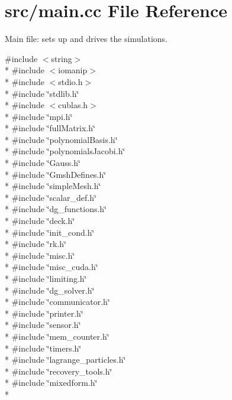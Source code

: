\section{src/main.cc File Reference}
\label{main_8cc}


Main file\-: sets up and drives the simulations.  


{\ttfamily \#include $<$string$>$}\\*
{\ttfamily \#include $<$iomanip$>$}\\*
{\ttfamily \#include $<$stdio.\-h$>$}\\*
{\ttfamily \#include \char`\"{}stdlib.\-h\char`\"{}}\\*
{\ttfamily \#include $<$cublas.\-h$>$}\\*
{\ttfamily \#include \char`\"{}mpi.\-h\char`\"{}}\\*
{\ttfamily \#include \char`\"{}full\-Matrix.\-h\char`\"{}}\\*
{\ttfamily \#include \char`\"{}polynomial\-Basis.\-h\char`\"{}}\\*
{\ttfamily \#include \char`\"{}polynomials\-Jacobi.\-h\char`\"{}}\\*
{\ttfamily \#include \char`\"{}Gauss.\-h\char`\"{}}\\*
{\ttfamily \#include \char`\"{}Gmsh\-Defines.\-h\char`\"{}}\\*
{\ttfamily \#include \char`\"{}simple\-Mesh.\-h\char`\"{}}\\*
{\ttfamily \#include \char`\"{}scalar\-\_\-def.\-h\char`\"{}}\\*
{\ttfamily \#include \char`\"{}dg\-\_\-functions.\-h\char`\"{}}\\*
{\ttfamily \#include \char`\"{}deck.\-h\char`\"{}}\\*
{\ttfamily \#include \char`\"{}init\-\_\-cond.\-h\char`\"{}}\\*
{\ttfamily \#include \char`\"{}rk.\-h\char`\"{}}\\*
{\ttfamily \#include \char`\"{}misc.\-h\char`\"{}}\\*
{\ttfamily \#include \char`\"{}misc\-\_\-cuda.\-h\char`\"{}}\\*
{\ttfamily \#include \char`\"{}limiting.\-h\char`\"{}}\\*
{\ttfamily \#include \char`\"{}dg\-\_\-solver.\-h\char`\"{}}\\*
{\ttfamily \#include \char`\"{}communicator.\-h\char`\"{}}\\*
{\ttfamily \#include \char`\"{}printer.\-h\char`\"{}}\\*
{\ttfamily \#include \char`\"{}sensor.\-h\char`\"{}}\\*
{\ttfamily \#include \char`\"{}mem\-\_\-counter.\-h\char`\"{}}\\*
{\ttfamily \#include \char`\"{}timers.\-h\char`\"{}}\\*
{\ttfamily \#include \char`\"{}lagrange\-\_\-particles.\-h\char`\"{}}\\*
{\ttfamily \#include \char`\"{}recovery\-\_\-tools.\-h\char`\"{}}\\*
{\ttfamily \#include \char`\"{}mixedform.\-h\char`\"{}}\\*
